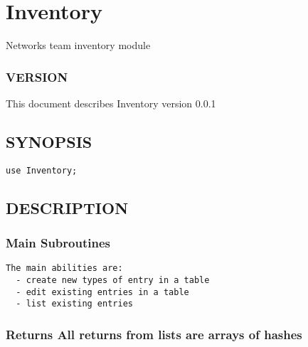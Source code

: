 \documentclass{book}
\begin{document}


\section{Inventory}
\label{_Inventory}
\hypertarget{_Inventory}{}



Networks team inventory module


\subsubsection{VERSION}
\label{Inventory_VERSION}
\hypertarget{Inventory_VERSION}{}



This document describes Inventory version 0.0.1


\subsection{SYNOPSIS}
\label{Inventory_SYNOPSIS}
\hypertarget{Inventory_SYNOPSIS}{}


\begin{Verbatim}[fontfamily=courier,gobble=1,frame=lines,fontsize=\small]
  use Inventory;
\end{Verbatim}


\subsection{DESCRIPTION}
\label{Inventory_DESCRIPTION}
\hypertarget{Inventory_DESCRIPTION}{}


\subsubsection{Main Subroutines}
\label{Inventory_Main_Subroutines}
\hypertarget{Inventory_Main_Subroutines}{}


\begin{Verbatim}[fontfamily=courier,gobble=1,frame=lines,fontsize=\small]
 The main abilities are:
  - create new types of entry in a table
  - edit existing entries in a table
  - list existing entries
\end{Verbatim}


\subsubsection{Returns All returns from lists are arrays of hashes}
\label{Inventory_Returns_All_returns_from_lists_are_arrays_of_hashes}
\hypertarget{Inventory_Returns_All_returns_from_lists_are_arrays_of_hashes}{}
\end{document}
